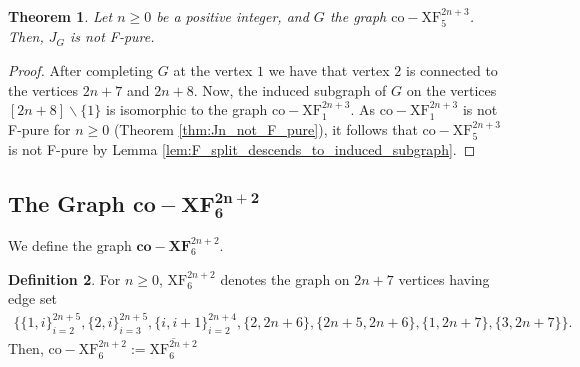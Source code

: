 \documentclass[12pt,a4paper]{amsart}
\theoremstyle{plain}
\newtheorem{thrm}{Theorem}[section]
\def\bthm{\begin{thrm}}
\def\ethm{\end{thrm}}
\theoremstyle{definition}
\newtheorem{defn}[thrm]{Definition}
\def\bdefn{\begin{defn}}
\def\edefn{\end{defn}}
\def\bproof{\begin{proof}}
\def\eproof{\end{proof}}
\theoremstyle{remark}
\let\setminus=\smallsetminus
\newcommand{\ol}[1]{\overline{#1}}
\begin{document}
\bthm
\label{thm:Jn1_not_F_pure}
Let $n \geq 0$ be a positive integer, and $G$ the graph $\mathrm{co\!-\!XF}_5^{2n+3}$. Then, $J_{G}$ is not F-pure.
\ethm 

\bproof
After completing $G$ at the vertex $1$ we have that vertex $2$ is connected to the vertices $2n+7$ and $2n+8$. Now, the induced subgraph of $G$ on the vertices $[2n+8] \setminus \{1\}$ is isomorphic to the graph $\mathrm{co\!-\!XF}_1^{2n+3}$. As $\mathrm{co\!-\!XF}_1^{2n+3}$ is not F-pure for $n\geq 0$ (Theorem \ref{thm:Jn_not_F_pure}), it follows that $\mathrm{co\!-\!XF}_5^{2n+3}$ is not F-pure by Lemma \ref{lem:F_split_descends_to_induced_subgraph}.
\eproof

\subsection{The Graph $\mathbf{co\!-\!XF_6^{2n+2}}$}

We define the graph $\mathbf{co\!-\!XF}_6^{2n+2}$.
\bdefn
\label{defn:Jn2}
For $n \geq 0$, $\mathrm{XF}_6^{2n+2}$ denotes the graph on $2n+7$ vertices having edge set 
\begin{align*}
\{ \{1,i\}_{i = 2}^{2n+5}, \{2,i\}_{i = 3}^{2n+5}, \{i,i+1\}_{i=2}^{2n+4}, \{2,2n+6\}, \{2n+5,2n+6\}, \{1, 2n+7\}, \{3, 2n+7\} \}.
\end{align*}
Then, $\mathrm{co\!-\!XF}_6^{2n+2} := \ol{\mathrm{XF}_6^{2n+2}}$
\edefn


\def\edJnT{2}

\def\ptsJnT{-.433884*\edJnT/-.900969*\edJnT/1/180,
.433884*\edJnT/-.900969*\edJnT/2/0,
.974928*\edJnT/-.222521*\edJnT/3/0,
.781831*\edJnT/.62349*\edJnT/4/0,
-.781831*\edJnT/.62349*\edJnT/2n+4/180,
-.974928*\edJnT/-.222521*\edJnT/2n+5/180,
1.5*-1.408812*\edJnT/1.5*-1.12349*\edJnT/2n+6/180,
1.5*1.408812*\edJnT/1.5*-1.12349*\edJnT/2n+7/0
}
    
\def\ptsJnTUnlabel{0*\edJnT/1*\edJnT/5}

\def\edgesJnT{
    1/2,
    1/3,
    1/4,
    1/5,
    1/2n+4,
    1/2n+5,
    2/3,
    3/4,
    5/2n+4,
    2n+4/2n+5,
    2/4,
    2/5,
    2/2n+4,
    2/2n+5,
    2/2n+6,
    2n+5/2n+6,
    1/2n+7,
    3/2n+7}
\end{document}
